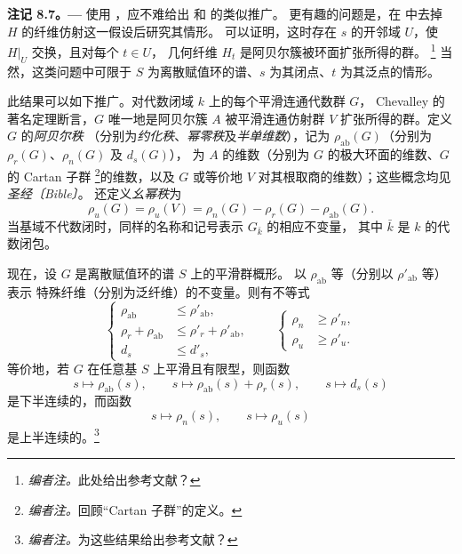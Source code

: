 \par\medskip\noindent{}\textbf{注记 8.7。---}\enspace
使用 ，应不难给出
 和  的类似推广。
更有趣的问题是，在  中去掉 \(H\) 的纤维仿射这一假设后研究其情形。
可以证明，这时存在 \(s\) 的开邻域 \(U\)，使 \(H|_U\) 交换，且对每个 \(t\in U\)，
几何纤维 \(H_t\) 是阿贝尔簇被环面扩张所得的群。
\footnote{\textit{编者注。}此处给出参考文献？}
当然，这类问题中可限于 \(S\) 为离散赋值环的谱、\(s\) 为其闭点、\(t\) 为其泛点的情形。

此结果可以如下推广。对代数闭域 \(k\) 上的每个平滑连通代数群 \(G\)，
Chevalley 的著名定理断言，\(G\) 唯一地是阿贝尔簇 \(A\) 被平滑连通仿射群
\(V\) 扩张所得的群。定义 \(G\) 的\emph{阿贝尔秩}
（分别为\emph{约化秩}、\emph{幂零秩}及\emph{半单维数}），记为
\(\rho_{\mathrm{ab}}(G)\)（分别为 \(\rho_r(G)\)、\(\rho_n(G)\) 及 \(d_s(G)\)），
为 \(A\) 的维数（分别为 \(G\) 的极大环面的维数、\(G\) 的 Cartan 子群
\footnote{\textit{编者注。}回顾“Cartan 子群”的定义。}的维数，以及 \(G\)
或等价地 \(V\) 对其根取商的维数）；这些概念均见\emph{圣经〔Bible〕}。
还定义\emph{幺幂秩}为
\[
  \rho_u(G)=\rho_u(V)
  =\rho_n(G)-\rho_r(G)-\rho_{\mathrm{ab}}(G).
\]
当基域不代数闭时，同样的名称和记号表示 \(G_{\bar{k}}\) 的相应不变量，
其中 \(\bar{k}\) 是 \(k\) 的代数闭包。

现在，设 \(G\) 是离散赋值环的谱 \(S\) 上的平滑群概形。
以 \(\rho_{\mathrm{ab}}\) 等（分别以 \(\rho'_{\mathrm{ab}}\) 等）表示
特殊纤维（分别为泛纤维）的不变量。则有不等式
\[
  \left\{
  \begin{aligned}
    \rho_{\mathrm{ab}}&\leq \rho'_{\mathrm{ab}},\\
    \rho_r+\rho_{\mathrm{ab}}&\leq
      \rho'_r+\rho'_{\mathrm{ab}},\\
    d_s&\leq d'_s,
  \end{aligned}
  \right.
  \qquad
  \left\{
  \begin{aligned}
    \rho_n&\geq \rho'_n,\\
    \rho_u&\geq \rho'_u.
  \end{aligned}
  \right.
\]
等价地，若 \(G\) 在任意基 \(S\) 上平滑且有限型，则函数
\[
  s\longmapsto \rho_{\mathrm{ab}}(s),\qquad
  s\longmapsto \rho_{\mathrm{ab}}(s)+\rho_r(s),\qquad
  s\longmapsto d_s(s)
\]
是下半连续的，而函数
\[
  s\longmapsto \rho_n(s),\qquad
  s\longmapsto \rho_u(s)
\]
是上半连续的。\footnote{\textit{编者注。}为这些结果给出参考文献？}

